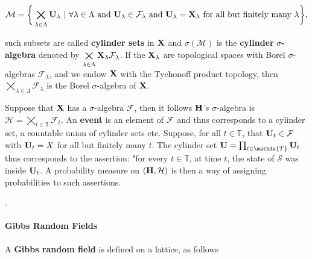 \documentclass{homework}
\begin{document}
{\begin{itemize}
        $$
        \mathcal{M} = \bigg\{\bigtimes\limits_{\lambda \in \Lambda}{\bf U}_\lambda \textnormal{ } | \textnormal{ } \forall \lambda \in \Lambda \textnormal{ and } {\bf U}_{\lambda} \in \mathcal{F}_{\lambda} \textnormal{ and } {\bf U}_{\lambda} = {\bf X}_{\lambda} \textnormal{ for all but finitely many } \lambda \bigg\},
        $$
        
    such subsets are called \textbf{cylinder sets} in ${\bf X}$ and $\sigma(\mathcal{M})$ is the \textbf{cylinder} $\sigma$\textbf{-algebra} denoted by $\bigtimes\limits_{\lambda \in \Lambda}{\bf X}_\lambda \mathcal{F}_{\lambda}$. If the ${\bf X}_{\lambda}$ are topological spaces with Borel $\sigma$-algebras $\mathcal{F}_{\lambda}$, and we endow ${\bf X}$ with the Tychonoff product topology, then $\bigtimes\limits_{\lambda \in \Lambda} \mathcal{F}_{\lambda}$ is the Borel $\sigma$-algebra of ${\bf X}$. \\
    \end{itemize}
    
    Suppose that ${\bf X}$ has a $\sigma$-algebra $\mathcal{F}$, then it follows ${\bf H}$'s $\sigma$-algebra is $\mathcal{H}= \bigtimes\limits_{t \in \mathds{T}}\mathcal{F}_t$. An \textbf{event} is an element of $\mathcal{F}$ and thus corresponds to a cylinder set, a countable union of cylinder sets etc. Suppose, for all ${t\in \mathds{T}}$, that ${\bf U}_t \in \mathcal{F}$ with ${\bf U}_t = X$ for all but finitely many $t$. The cylinder set ${\bf U} = \prod_{t \in \mathds{T}} {\bf U}_t$ thus corresponds to the assertion: "for every ${t\in \mathds{T}}$, at time $t$, the state of $\mathcal{S}$ was inside ${\bf U}_t$. A probability measure on $(\bf H, \mathcal{H})$ is then a way of assigning probabilities to such assertions. }. \\
    
\paragraph{\textbf{Gibbs Random Fields}}

A \textbf{Gibbs random field} is defined on a lattice, as follows
\end{document}
